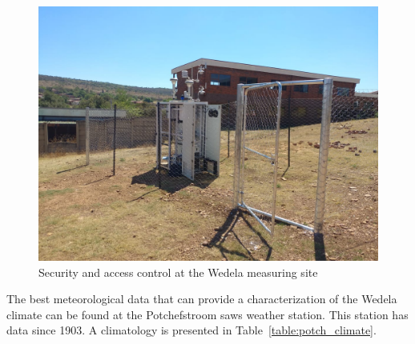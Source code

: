 \documentclass{nwureport}
\begin{document}
\begin{figure}[!htb]
    \centering
    \includegraphics[width=\textwidth]{images/wedela_4.jpeg}
    \caption[Security and access control at the Wedela measuring site]{Security and access control at the Wedela measuring site}
    \label{fig:wadela_fence}
\end{figure}

The best meteorological data that can provide a characterization of the Wedela climate can be found at the Potchefstroom \gls{saws} weather station. This station has data since 1903. A climatology is presented in Table~\ref{table:potch_climate}.
\end{document}

